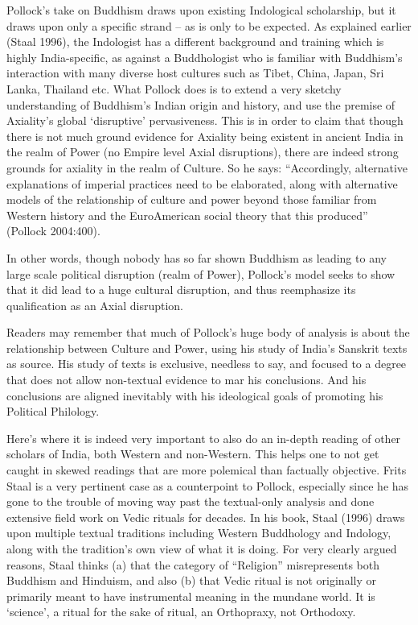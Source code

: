 Pollock’s take on Buddhism draws upon existing Indological scholarship, but it draws upon only a specific strand – as is only to be expected. As explained earlier (Staal 1996), the Indologist has a different background and training which is highly India-specific, as against a Buddhologist who is familiar with Buddhism’s interaction with many diverse host cultures such as Tibet, China, Japan, Sri Lanka, Thailand etc. What Pollock does is to extend a very sketchy understanding of Buddhism’s Indian origin and history, and use the premise of Axiality’s global ‘disruptive’ pervasiveness. This is in order to claim that though there is not much ground evidence for Axiality being existent in ancient India in the realm of Power (no Empire level Axial disruptions), there are indeed strong grounds for axiality in the realm of Culture. So he says: “Accordingly, alternative explanations of imperial practices need to be elaborated, along with alternative models of the relationship of culture and power beyond those familiar from Western history and the EuroAmerican social theory that this produced” (Pollock 2004:400).

In other words, though nobody has so far shown Buddhism as leading to any large scale political disruption (realm of Power), Pollock’s model seeks to show that it did lead to a huge cultural disruption, and thus reemphasize its qualification as an Axial disruption.

Readers may remember that much of Pollock’s huge body of analysis is about the relationship between Culture and Power, using his study of India’s Sanskrit texts as source. His study of texts is exclusive, needless to say, and focused to a degree that does not allow non-textual evidence to mar his conclusions. And his conclusions are aligned inevitably with his ideological goals of promoting his Political Philology.

Here’s where it is indeed very important to also do an in-depth reading of other scholars of India, both Western and non-Western. This helps one to not get caught in skewed readings that are more polemical than factually objective. Frits Staal is a very pertinent case as a counterpoint to Pollock, especially since he has gone to the trouble of moving way past the textual-only analysis and done extensive field work on Vedic rituals for decades. In his book, Staal (1996) draws upon multiple textual traditions including Western Buddhology and Indology, along with the tradition’s own view of what it is doing. For very clearly argued reasons, Staal thinks (a) that the category of “Religion” misrepresents both Buddhism and Hinduism, and also (b) that Vedic ritual is not originally or primarily meant to have instrumental meaning in the mundane world. It is ‘science’, a ritual for the sake of ritual, an Orthopraxy, not Orthodoxy.

